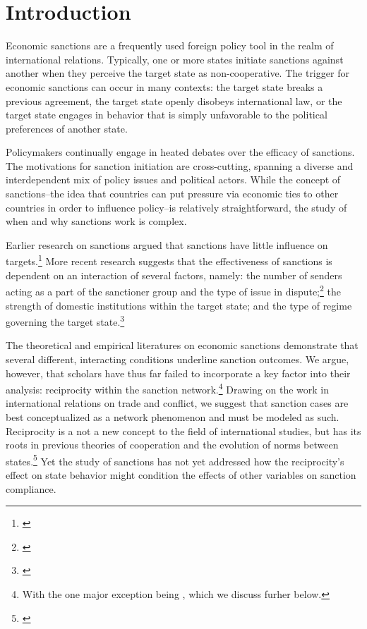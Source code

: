 \section*{Introduction}
\label{intro}

Economic sanctions are a frequently used foreign policy tool in the realm of international relations. Typically, one or more states initiate sanctions against another when they perceive the target state as non-cooperative. The trigger for economic sanctions can occur in many contexts: the target state breaks a previous agreement, the target state openly disobeys international law, or the target state engages in behavior that is simply unfavorable to the political preferences of another state. 

Policymakers continually engage in heated debates over the efficacy of sanctions. The motivations for sanction initiation are cross-cutting, spanning a diverse and interdependent mix of policy issues and political actors. While the concept of sanctions--the idea that countries can put pressure via economic ties to other countries in order to influence policy--is relatively straightforward, the study of when and why sanctions work is complex.

Earlier research on sanctions argued that sanctions have little influence on targets.\footnote{\cite{lam1990, dashti1997, morgan1997, drezner1998}} More recent research suggests that the effectiveness of sanctions is dependent on an interaction of several factors, namely: the number of senders acting as a part of the sanctioner group and the type of issue in dispute;\footnote{\cite{miers2002, morgan2009threat}} the strength of domestic institutions within the target state; and the type of regime governing the target state.\footnote{\cite{mcgillivray2004}} 

The theoretical and empirical literatures on economic sanctions demonstrate that several different, interacting conditions underline sanction outcomes. We argue, however, that scholars have thus far failed to incorporate a key factor into their analysis: reciprocity within the sanction network.\footnote{With the one major exception being \cite{cranmer2014reciprocity}, which we discuss furher below.} Drawing on the work in international relations on trade and conflict, we suggest that sanction cases are best conceptualized as a network phenomenon and must be modeled as such. Reciprocity is a not a new concept to the field of international studies, but has its roots in previous theories of cooperation and the evolution of norms between states.\footnote{\cite{richardsonai:1960,choucri:north:1972,goldstein1991reciprocity,rajmaira1990evolving,ward1992reciprocity}} Yet the study of sanctions has not yet addressed how the reciprocity's effect on state behavior might condition the effects of other variables on sanction compliance. 


